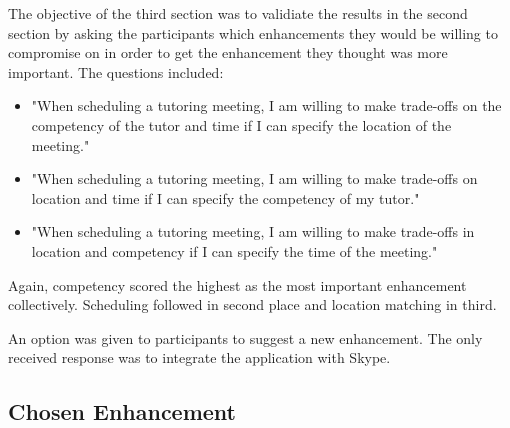 The objective of the third section was to validiate the results in the second section by asking the participants which enhancements they would be willing to compromise on in order to get the enhancement they thought was more important. The questions included:
 \begin{itemize}
  \item "When scheduling a tutoring meeting, I am willing to make trade-offs on the competency of the tutor and time if I can specify the location of the meeting."
  \item "When scheduling a tutoring meeting, I am willing to make trade-offs on location and time if I can specify the competency of my tutor."
  \item "When scheduling a tutoring meeting, I am willing to make trade-offs in location and competency if I can specify the time of the meeting."
\end{itemize}
Again, competency scored the highest as the most important enhancement collectively. Scheduling followed in second place and location matching in third.

An option was given to participants to suggest a new enhancement. The only received response was to integrate the application with Skype.

\subsection{Chosen Enhancement}
\label{sec:chosen-enhancement}

